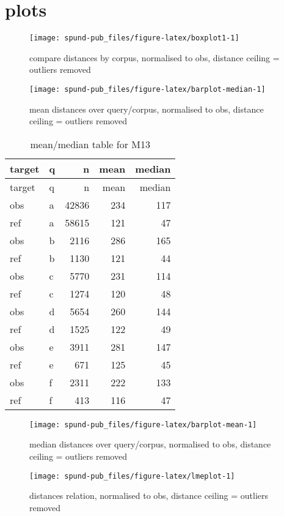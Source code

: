 \documentclass[
  12pt,
  oneside]{book}
\begin{document}
\section{plots}\label{plots}

\begin{figure}[H]
\texttt{[image: spund-pub\_files/figure-latex/boxplot1-1]} \caption{compare distances by corpus, normalised to obs, distance ceiling =  outliers removed}\label{fig:boxplot1}
\end{figure}

\begin{figure}[H]
\texttt{[image: spund-pub\_files/figure-latex/barplot-median-1]} \caption{mean distances over query/corpus, normalised to obs, distance ceiling =  outliers removed}\label{fig:barplot-median}
\end{figure}

\begin{longtable}[]{@{}llrrr@{}}
\caption{\label{tab:dfe-table}mean/median table for M13}\tabularnewline
\toprule\noalign{}
target & q & n & mean & median \\
\midrule\noalign{}
\endfirsthead
\toprule\noalign{}
target & q & n & mean & median \\
\midrule\noalign{}
\endhead
\bottomrule\noalign{}
\endlastfoot
obs & a & 42836 & 234 & 117 \\
ref & a & 58615 & 121 & 47 \\
obs & b & 2116 & 286 & 165 \\
ref & b & 1130 & 121 & 44 \\
obs & c & 5770 & 231 & 114 \\
ref & c & 1274 & 120 & 48 \\
obs & d & 5654 & 260 & 144 \\
ref & d & 1525 & 122 & 49 \\
obs & e & 3911 & 281 & 147 \\
ref & e & 671 & 125 & 45 \\
obs & f & 2311 & 222 & 133 \\
ref & f & 413 & 116 & 47 \\
\end{longtable}

\begin{figure}[H]
\texttt{[image: spund-pub\_files/figure-latex/barplot-mean-1]} \caption{median distances over query/corpus, normalised to obs, distance ceiling =  outliers removed}\label{fig:barplot-mean}
\end{figure}

\begin{figure}[H]
\texttt{[image: spund-pub\_files/figure-latex/lmeplot-1]} \caption{distances relation, normalised to obs, distance ceiling =  outliers removed}\label{fig:lmeplot}
\end{figure}
\end{document}
